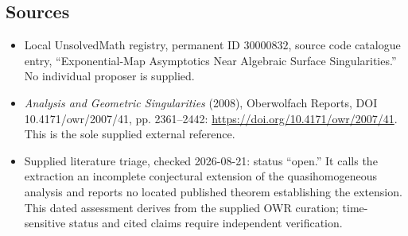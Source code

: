 \documentclass[11pt]{article}
\begin{document}
\subsection{Sources}
\begin{itemize}
\item Local UnsolvedMath registry, permanent ID \(30000832\), source code catalogue entry, ``Exponential-Map Asymptotics Near Algebraic Surface Singularities.'' No individual proposer is supplied.
\item \emph{Analysis and Geometric Singularities} (2008), Oberwolfach Reports, DOI 10.4171/owr/2007/41, pp. 2361--2442: \url{https://doi.org/10.4171/owr/2007/41}. This is the sole supplied external reference.
\item Supplied literature triage, checked 2026-08-21: status ``open.'' It calls the extraction an incomplete conjectural extension of the quasihomogeneous analysis and reports no located published theorem establishing the extension. This dated assessment derives from the supplied OWR curation; time-sensitive status and cited claims require independent verification.
\end{itemize}
\end{document}
